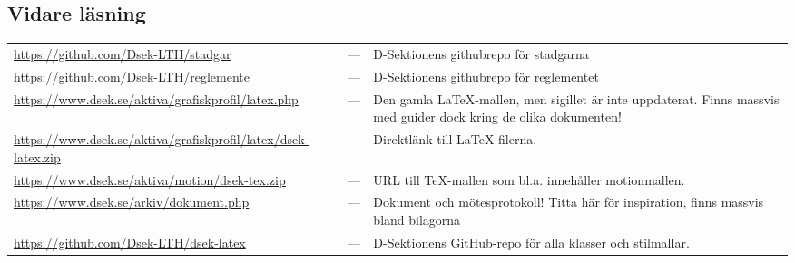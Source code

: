 \documentclass[nopdfbookmarks,a4paper, 11pt, twoside]{article}
\begin{document}
\subsection{Vidare läsning}
\renewcommand\UrlFont{\color{datarosa}\rmfamily\small}
\def\arraystretch{1.5}
\begin{tabularx}{1.0\textwidth} { XlX }
   \url{https://github.com/Dsek-LTH/stadgar}&---& D-Sektionens githubrepo för stadgarna  \\
   \url{https://github.com/Dsek-LTH/reglemente}&---& D-Sektionens githubrepo för reglementet  \\
   \url{https://www.dsek.se/aktiva/grafiskprofil/latex.php}&---& Den gamla \LaTeX-mallen, men sigillet är inte uppdaterat. Finns massvis med guider dock kring de olika dokumenten! \\
\url{https://www.dsek.se/aktiva/grafiskprofil/latex/dsek-latex.zip}&---& Direktlänk till \LaTeX-filerna.  \\
\url{https://www.dsek.se/aktiva/motion/dsek-tex.zip}&---& URL till \TeX-mallen som bl.a. innehåller motionmallen.  \\
\url{https://www.dsek.se/arkiv/dokument.php}&---& Dokument och mötesprotokoll! Titta här för inspiration, finns massvis bland bilagorna \\
\url{https://github.com/Dsek-LTH/dsek-latex}&---& D-Sektionens GitHub-repo för alla klasser och stilmallar. 

\end{tabularx}
\end{document}
